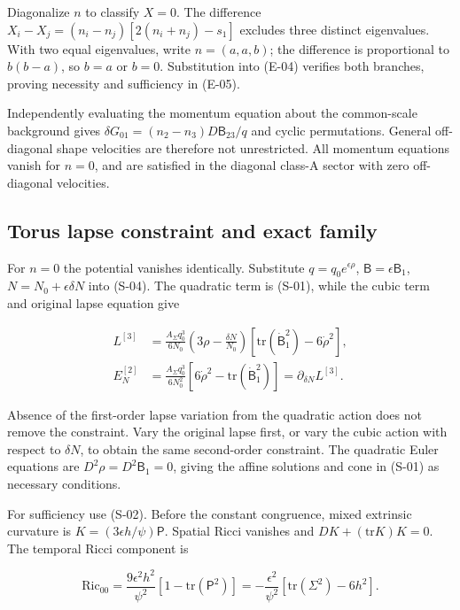 Diagonalize $n$ to classify $X=0$. The difference $X_i-X_j=(n_i-n_j)[2(n_i+n_j)-s_1]$ excludes three distinct eigenvalues. With two equal eigenvalues, write $n=(a,a,b)$; the difference is proportional to $b(b-a)$, so $b=a$ or $b=0$. Substitution into (E-04) verifies both branches, proving necessity and sufficiency in (E-05).

Independently evaluating the momentum equation about the common-scale background gives $\delta G_{01}=(n_2-n_3)D\mathsf B_{23}/q$ and cyclic permutations. General off-diagonal shape velocities are therefore not unrestricted. All momentum equations vanish for $n=0$, and are satisfied in the diagonal class-A sector with zero off-diagonal velocities.

\subsection{Torus lapse constraint and exact family}

For $n=0$ the potential vanishes identically. Substitute $q=q_0e^{\epsilon\rho}$, $\mathsf B=\epsilon\mathsf B_1$, $N=N_0+\epsilon\delta N$ into (S-04). The quadratic term is (S-01), while the cubic term and original lapse equation give

\begin{equation}\tag{S-06}\label{eq:S-06}
\begin{aligned}
L^{[3]}&=\frac{A_{\Sigma}q_0^3}{6N_0}\left(3\rho-\frac{\delta N}{N_0}\right)
 [\mathrm{tr}(\dot{\mathsf B}_1^2)-6\dot\rho^2],\\
E_N^{[2]}&=\frac{A_{\Sigma}q_0^3}{6N_0^2}[6\dot\rho^2-\mathrm{tr}(\dot{\mathsf B}_1^2)]
 =\partial_{\delta N}L^{[3]}.
\end{aligned}
\end{equation}

Absence of the first-order lapse variation from the quadratic action does not remove the constraint. Vary the original lapse first, or vary the cubic action with respect to $\delta N$, to obtain the same second-order constraint. The quadratic Euler equations are $D^2\rho=D^2\mathsf B_1=0$, giving the affine solutions and cone in (S-01) as necessary conditions.

For sufficiency use (S-02). Before the constant congruence, mixed extrinsic curvature is $K=(3\epsilon h/\psi)\mathsf P$. Spatial Ricci vanishes and $DK+(\mathrm{tr}K)K=0$. The temporal Ricci component is

\begin{equation}\tag{S-07}\label{eq:S-07}
\mathrm{Ric}_{00}=\frac{9\epsilon^2h^2}{\psi^2}[1-\mathrm{tr}(\mathsf P^2)]=-\frac{\epsilon^2}{\psi^2}[\mathrm{tr}(\Sigma^2)-6h^2].
\end{equation}

